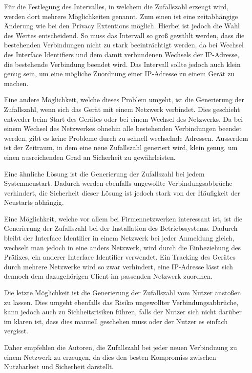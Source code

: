 \documentclass[a4paper, 12pt]{scrartcl}
\begin{document}
Für die Festlegung des Intervalles, in welchem die Zufallszahl erzeugt wird, werden dort mehrere Möglichkeiten genannt.
Zum einen ist eine zeitabhängige Änderung wie bei den Privacy Extentions möglich.
Hierbei ist jedoch die Wahl des Wertes entscheidend. So muss das Intervall so groß gewählt werden, dass die bestehenden Verbindungen nicht zu stark beeinträchtigt werden, da bei Wechsel des Interface Identifiers und dem damit verbundenen Wechsels der IP-Adresse, die bestehende Verbindung beendet wird.
Das Intervall sollte jedoch auch klein genug sein, um eine mögliche Zuordnung einer IP-Adresse zu einem Gerät zu machen.

Eine andere Möglichkeit, welche dieses Problem umgeht, ist die Generierung der Zufallszahl, wenn sich das Gerät mit einem Netzwerk verbindet. Dies geschieht entweder beim Start des Gerätes oder bei einem Wechsel des Netzwerks. 
Da bei einem Wechsel des Netzwerkes ohnehin alle bestehenden Verbindungen beendet werden, gibt es keine Probleme durch zu schnell wechselnde Adressen.
Ausserdem ist der Zeitraum, in dem eine neue Zufallszahl generiert wird, klein genug, um einen ausreichenden Grad an Sicherheit zu gewährleisten.

Eine ähnliche Lösung ist die Generierung der Zufallszahl bei jedem Systemneustart. Dadurch werden ebenfalls ungewollte Verbindungsabbrüche verhindert, die Sicherheit dieser Lösung ist jedoch stark von der Häufigkeit der Neustarts abhängig. 

Eine Möglichkeit, welche vor allem bei Firmennetzwerken interessant ist, ist die Generierung der Zufallszahl bei der Installation des Betriebssystems. Dadurch bleibt der Interface Identifier in einem Netzwerk bei jeder Anmeldung gleich, wechselt man jedoch in eine anders Netzwerk, wird durch die Einbeziehung des Präfixes, ein anderer Interface Identifier verwendet. 
Ein Tracking des Gerätes durch mehrere Netzwerke wird so zwar verhindert, eine IP-Adresse lässt sich dennoch dem dazugehörigen Client im passenden Netzwerk zuordnen.

Die letzte Möglichkeit ist die Generierung der Zufallszahl vom Nutzer anstoßen zu lassen. Dies umgeht ebenfalls das Risiko ungewollter Verbindungsabbrüche, kann jedoch auch zu Sichheitsrisiken führen, falls der Nutzer sich nicht darüber im klaren ist, dass dies manuell geschehen muss oder der Nutzer es einfach vergisst.

Daher empfehlen die Autoren, die Zufallszahl bei jeder neuen Verbindnung zu einem Netzwerk zu erzeugen, da dies den besten Kompromiss zwischen Nutzbarkeit und Sicherheit darstellt.
\end{document}
